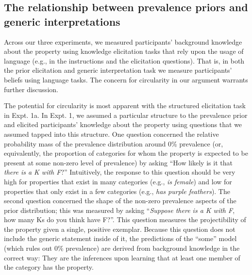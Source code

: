 \documentclass[floatsintext,man]{apa6}
\theoremstyle{definition}
\theoremstyle{definition}
\theoremstyle{definition}
\theoremstyle{remark}
\begin{document}

\subsection{The relationship between prevalence priors and generic
interpretations}\label{the-relationship-between-prevalence-priors-and-generic-interpretations}

Across our three experiments, we measured participants' background
knowledge about the property using knowledge elicitation tasks that rely
upon the usage of language (e.g., in the instructions and the
elicitation questions). That is, in both the prior elicitation and
generic interpretation task we measure participants' beliefs using
language tasks. The concern for circularity in our argument warrants
further discussion.

The potential for circularity is most apparent with the structured
elicitation task in Expt. 1a. In Expt. 1, we assumed a particular
structure to the prevalence prior and elicited participants' knowledge
about the property using questions that we assumed tapped into this
structure. One question concerned the relative probability mass of the
prevalence distribution around 0\% prevalence (or, equivalently, the
proportion of categories for whom the property is expected to be present
at some non-zero level of prevalence) by asking \enquote{How likely is
it that \emph{there is a K with F}?} Intuitively, the response to this
question should be very high for properties that exist in many
categories (e.g., \emph{is female}) and low for properties that only
exist in a few categories (e.g., \emph{has purple feathers}). The second
question concerned the shape of the non-zero prevalence aspects of the
prior distribution; this was measured by asking \enquote{\emph{Suppose
there is a K with F}, how many Ks do you think have F?}. This question
measures the projectibility of the property given a single, positive
exemplar. Because this question does not include the generic statement
inside of it, the predictions of the \enquote{some} model (which rules
out 0\% prevalence) are derived from background knowledge in the correct
way: They are the inferences upon learning that at least one member of
the category has the property.
\end{document}
